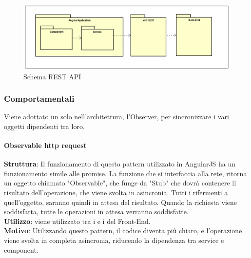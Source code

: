 \documentclass[../DefinizioneDiProdotto_v2.0.0.tex]{subfiles}
\begin{document}
\begin{figure}[!h]
	\centering
	\includegraphics[width=\textwidth]{Architettura/API-Rest.png}
	\caption{Schema REST API}
\end{figure}

\subsubsection{Comportamentali}
Viene adottato un solo  nell'architettura, l'Observer, per sincronizzare i vari oggetti dipendenti tra loro.

\paragraph{Observable http request}\mbox{}
\begin{addmargin}[1em]{2em}%
	\textbf{Struttura}: Il funzionamento di questo pattern utilizzato in AngularJS ha un funzionamento simile alle promise.
	La funzione che si interfaccia alla rete, ritorna un oggetto chiamato "Observable", che funge da "Stub" che dovrà contenere il risultato dell'operazione, che viene svolta in asincronia.
	Tutti i rifermenti a quell'oggetto, saranno quindi in attesa del risultato. Quando la richiesta viene soddisfatta, tutte le operazioni in attesa verranno soddisfatte.  \\
	\textbf{Utilizzo}: viene utilizzato tra i  e i  del Front-End.\\
	\textbf{Motivo}: Utilizzando questo pattern, il codice diventa più chiaro, e l'operazione viene svolta in completa asincronia, riducendo la dipendenza tra service e component.
\end{addmargin}
\end{document}
